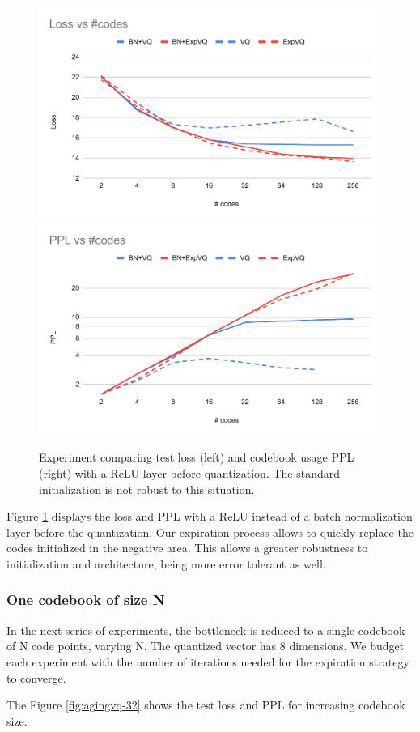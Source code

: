 \begin{figure}
    \centering
    \includegraphics[width=0.45\columnwidth]{60-files/chartloss.pdf}
    \includegraphics[width=0.45\columnwidth]{60-files/chartppl.pdf}
    \caption{Experiment comparing test loss (left) and codebook usage PPL (right) with a ReLU layer before quantization. The standard initialization is not robust to this situation.}
    \label{fig:agingvq-training-nobn}
\end{figure}

Figure \ref{fig:agingvq-training-nobn} displays the loss and PPL with a ReLU instead of a batch normalization layer before the quantization. Our expiration process allows to quickly replace the codes initialized in the negative area. This allows a greater robustness to initialization and architecture, being more error tolerant as well.

\subsubsection{One codebook of size N}

In the next series of experiments, the bottleneck is reduced to a single codebook of N code points, varying N. The quantized vector has 8 dimensions. We budget each experiment with the number of iterations needed for the expiration strategy to converge.

The Figure \ref{fig:agingvq-32} shows the test loss and PPL for increasing codebook size.

